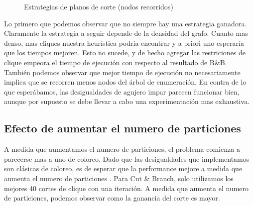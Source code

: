 \begin{figure}[h]
\begin{minipage}[b]{0.49\textwidth}
    \caption{Estrategias de planos de corte (nodos recorridos)}
  \end{minipage}
\end{figure}

Lo primero que podemos observar que no siempre hay una estrategia ganadora. Claramente la estrategia a seguir depende de la densidad del grafo. Cuanto mas denso, mas cliques nuestra heurística podría encontrar y a priori uno esperaría que los tiempos mejoren. Esto no sucede, y de hecho agregar las restriciones de clique empeora el tiempo de ejecución con respecto al resultado de B\&B. También podemos observar que mejor tiempo de ejecución no necesariamente implica que se recorren menos nodos del árbol de enumeración. En contra de lo que esperábamos, las desigualdades de agujero impar parecen funcionar bien, aunque por supuesto se debe llevar a cabo una experimentación mas exhaustiva.

\subsection{Efecto de aumentar el numero de particiones}

A medida que aumentamos el numero de particiones, el problema comienza a parecerse mas a uno de coloreo. Dado que las desigualdades que implementamos son clásicas de coloreo, es de esperar que la performance mejore a medida que aumenta el numero de particiones \cite{coloring}. Para Cut \& Branch, solo utilizamos los mejores 40 cortes de clique con una iteración. A medida que aumenta el numero de particiones, podemos observar como la ganancia del corte es mayor.

